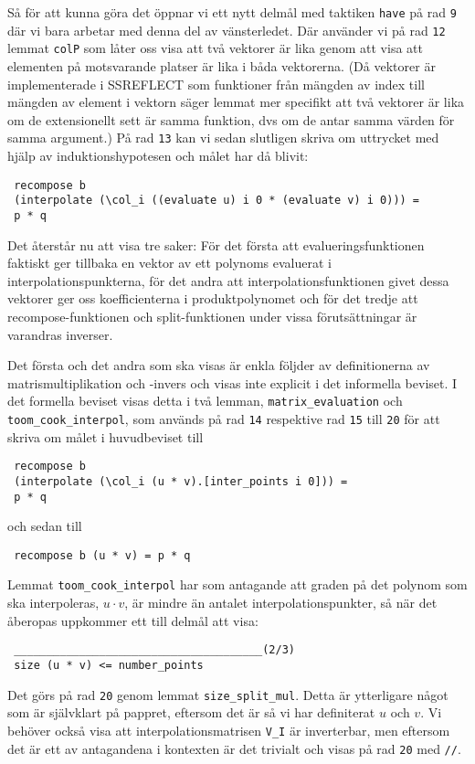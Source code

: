 Så för att kunna göra det öppnar vi ett nytt delmål med taktiken \verb=have= på rad \verb+9+ där vi bara
arbetar med denna
del av vänsterledet. Där använder vi på rad \verb+12+ lemmat \verb=colP= som låter oss visa att två vektorer 
är lika genom att visa att elementen på motsvarande platser är lika i båda vektorerna. (Då
vektorer är implementerade i SSREFLECT som funktioner från mängden av index till mängden 
av element i vektorn säger lemmat mer specifikt att två vektorer är lika om de extensionellt
sett är samma funktion, dvs om de antar samma värden för samma argument.) På rad \verb+13+
kan vi sedan slutligen skriva om uttrycket med hjälp av induktionshypotesen och målet har då blivit:
\begin{verbatim}
 recompose b 
 (interpolate (\col_i ((evaluate u) i 0 * (evaluate v) i 0))) =
 p * q
\end{verbatim}

Det återstår nu att visa tre saker: För det första att evalueringsfunktionen faktiskt ger tillbaka
en vektor av ett polynoms evaluerat i interpolationspunkterna, för det andra att interpolationsfunktionen
givet dessa vektorer ger oss koefficienterna i produktpolynomet och för det tredje att recompose-funktionen
och split-funktionen under vissa förutsättningar är varandras inverser.

Det första och det andra som ska visas är enkla följder av definitionerna av matrismultiplikation och -invers 
och visas inte explicit i det informella beviset. 
I det formella beviset visas detta i två lemman, \verb=matrix_evaluation= och 
\verb=toom_cook_interpol=, 
som används på rad \verb+14+ respektive rad \verb+15+ till \verb+20+ för att skriva om målet i huvudbeviset till
\begin{verbatim}
 recompose b 
 (interpolate (\col_i (u * v).[inter_points i 0])) = 
 p * q
\end{verbatim}
och sedan till
\begin{verbatim}
 recompose b (u * v) = p * q
\end{verbatim}
Lemmat \verb=toom_cook_interpol= har som 
antagande att graden på det polynom som ska interpoleras,
$u \cdot v$, är mindre än antalet interpolationspunkter, så när det åberopas uppkommer ett till delmål att
visa:
\begin{verbatim}
 ______________________________________(2/3)
 size (u * v) <= number_points
\end{verbatim}
Det görs på rad \verb+20+ genom lemmat \verb=size_split_mul=. Detta är ytterligare något som är 
självklart på pappret, eftersom det är så vi har definiterat $u$ och $v$. 
Vi behöver också visa att interpolationsmatrisen
\verb=V_I= är inverterbar, men eftersom det är ett av antagandena i kontexten är det trivialt 
och visas på rad \verb+20+ med \verb=//=.

